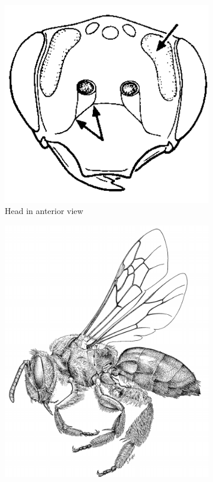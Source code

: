 \documentclass[letterpaper, 11pt]{article}
\begin{document}
\begin{figure}[ht!]
    \centering
    \begin{subfigure}[ht!]{0.26\textwidth}
        \includegraphics[width=\textwidth]{AndrenidFace}
        \caption{Head in anterior view \citep[][pg. 313]{goulet1993hymenoptera}}
        \label{fig:andrenid1}
    \end{subfigure}
    \qquad
    \begin{subfigure}[ht!]{0.38\textwidth}
        \includegraphics[width=\textwidth]{AndrenidHabitus}

\end{subfigure}
\end{figure}
\end{document}
